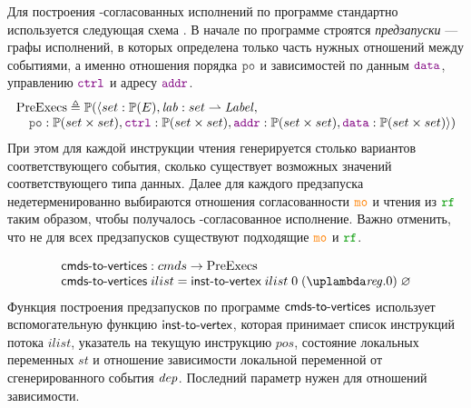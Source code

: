 Для построения \ARM-согласованных исполнений по программе стандартно
используется следующая схема \cite{Vafeiadis-Narayan:OOPSLA13}.
В начале по программе строятся \emph{предзапуски} --- графы исполнений, в которых определена
только часть нужных отношений между событиями, а именно отношения порядка $\lPO$ и зависимостей
по данным $\lDATA$, управлению $\lCTRL$ и адресу $\lADDR$.
\[
\inarr{
  \PreExecutions \defeq \Pset(\langle set : \Pset(E), \lab : set \rightharpoonup \Label, \\
   \quad \lPO : \Pset(set \times set), \lCTRL : \Pset(set \times set),
         \lADDR : \Pset(set \times set), \lDATA : \Pset(set \times set) \rangle) \\
}\]
При этом для каждой инструкции чтения
генерируется столько вариантов соответствующего события, сколько существует возможных значений
соответствующего типа данных.
Далее для каждого предзапуска недетерменированно выбираются отношения согласованности $\lCO$ и чтения из $\lRF$
таким образом, чтобы получалось \ARM-согласованное исполнение. Важно отменить, что не для всех предзапусков
существуют подходящие $\lCO$ и $\lRF$.

\[
\inarr{
  \cmdsToVrtxs : \Carm \rightarrow \PreExecutions \\
  \cmdsToVrtxs \; ilist = \instToVrtx \; ilist \; 0 \; (\lambda \reg. 0) \; \emptyset \\
}\]
Функция построения предзапусков по программе $\textup{\sf cmds-to-vertices}$ использует вспомогательную функцию $\textup{\sf inst-to-vertex}$,
которая принимает список инструкций потока $ilist$, указатель на текущую инструкцию $pos$,
состояние локальных переменных $st$ и отношение зависимости локальной переменной от сгенерированного события $\mathit{dep}$.
Последний параметр нужен для отношений зависимости.

